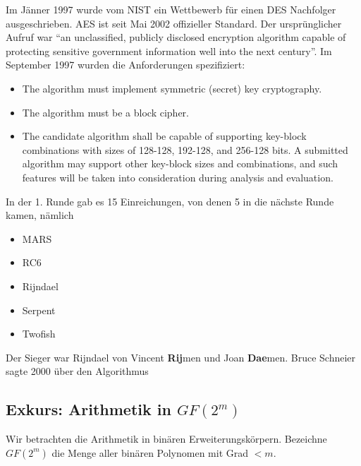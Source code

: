 Im Jänner 1997 wurde vom NIST ein Wettbewerb für einen DES Nachfolger ausgeschrieben.
AES ist seit Mai 2002 offizieller Standard. Der ursprünglicher Aufruf war ``an unclassified, publicly disclosed encryption algorithm capable of protecting sensitive 
government information well into the next century''.
Im September 1997 wurden die Anforderungen spezifiziert:

\begin{itemize}
    \item The algorithm must implement symmetric (secret) key cryptography.
    \item The algorithm must be a block cipher.
    \item The candidate algorithm shall be capable of supporting key-block combinations with sizes of 128-128, 192-128, and 256-128 bits. A submitted algorithm may support 
other key-block sizes and combinations, and such features will be taken into consideration during analysis and evaluation.
\end{itemize}

In der 1. Runde gab es 15 Einreichungen, von denen 5 in die nächste Runde kamen, nämlich 

\begin{itemize}
    \item MARS 
    \item RC6
    \item Rijndael 
    \item Serpent 
    \item Twofish
\end{itemize}

Der Sieger war Rijndael von Vincent \textbf{Rij}men und Joan \textbf{Dae}men. Bruce Schneier sagte 2000 über den Algorithmus 


\subsection{Exkurs: Arithmetik in $GF(2^m)$}

Wir betrachten die Arithmetik in binären Erweiterungskörpern.
Bezeichne $GF(2^m)$ die Menge aller binären Polynomen mit Grad $< m$.

